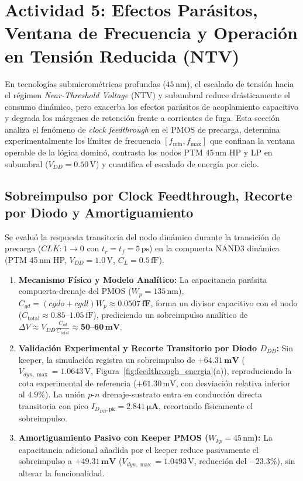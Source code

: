 \section{Actividad 5: Efectos Parásitos, Ventana de Frecuencia y Operación en Tensión Reducida (NTV)}
\label{sec:actividad5}

En tecnologías submicrométricas profundas ($45\,\text{nm}$), el escalado de tensión hacia el régimen \textit{Near-Threshold Voltage} (NTV) y subumbral reduce drásticamente el consumo dinámico, pero exacerba los efectos parásitos de acoplamiento capacitivo y degrada los márgenes de retención frente a corrientes de fuga. Esta sección analiza el fenómeno de \textit{clock feedthrough} en el PMOS de precarga, determina experimentalmente los límites de frecuencia $[f_{\min}, f_{\max}]$ que confinan la ventana operable de la lógica dominó, contrasta los nodos PTM 45\,nm HP y LP en subumbral ($V_{DD} = 0.50\,\text{V}$) y cuantifica el escalado de energía por ciclo.

\subsection{Sobreimpulso por Clock Feedthrough, Recorte por Diodo y Amortiguamiento}
Se evaluó la respuesta transitoria del nodo dinámico durante la transición de precarga ($CLK: 1 \to 0$ con $t_r = t_f = 5\,\text{ps}$) en la compuerta NAND3 dinámica (PTM 45\,nm HP, $V_{DD} = 1.0\,\text{V}$, $C_L = 0.5\,\text{fF}$).

\begin{enumerate}[leftmargin=1.4em,itemsep=0.01em]
  \item \textbf{Mecanismo Físico y Modelo Analítico:} La capacitancia parásita compuerta-drenaje del PMOS ($W_p = 135\,\text{nm}$), $C_{gd} = (cgdo + cgdl)W_p \approx \mathbf{0.0507\,\text{fF}}$, forma un divisor capacitivo con el nodo ($C_{\text{total}} \approx 0.85\text{--}1.05\,\text{fF}$), prediciendo un sobreimpulso analítico de $\Delta V \approx V_{DD}\frac{C_{gd}}{C_{\text{total}}} \approx \mathbf{50\text{--}60\,\text{mV}}$.
  \item \textbf{Validación Experimental y Recorte Transitorio por Diodo $D_{DB}$:} Sin keeper, la simulación registra un sobreimpulso de $\mathbf{+64.31\,\text{mV}}$ ($V_{dyn,\max} = 1.0643\,\text{V}$, Figura~\ref{fig:feedthrough_energia}(a)), reproduciendo la cota experimental de referencia ($+61.30\,\text{mV}$, con desviación relativa inferior al $4.9\%$). La unión $p\text{-}n$ drenaje-sustrato entra en conducción directa transitoria con pico $I_{D_{DB},\text{pk}} = \mathbf{2.841\,\mu\text{A}}$, recortando físicamente el sobreimpulso.
  \item \textbf{Amortiguamiento Pasivo con Keeper PMOS ($W_{kp} = 45\,\text{nm}$):} La capacitancia adicional añadida por el keeper reduce pasivamente el sobreimpulso a $\mathbf{+49.31\,\text{mV}}$ ($V_{dyn,\max} = 1.0493\,\text{V}$, reducción del $\mathbf{-23.3\%}$), sin alterar la funcionalidad.
\end{enumerate}


